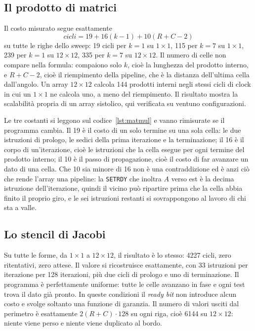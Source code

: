 \subsection{Il prodotto di matrici}
\label{sec:matmul-scala}

Il costo misurato segue esattamente
\[
    \mathit{cicli} = 19 + 16(k-1) + 10(R + C - 2)
\]
su tutte le righe dello sweep: 19 cicli per $k=1$ su $1\times1$, 115 per $k=7$
su $1\times1$, 239 per $k=1$ su $12\times12$, 335 per $k=7$ su $12\times12$.
Il numero di celle non compare nella formula: compaiono solo $k$, cioè
la lunghezza del prodotto interno, e $R+C-2$, cioè il riempimento della
pipeline, che è la distanza dell'ultima cella dall'angolo. Un array \(12 \times 12\)
calcola 144 prodotti interni negli stessi cicli di clock in cui un \(1 \times 1\) ne calcola
uno, a meno del riempimento. Il risultato mostra la scalabilità propria di un array
sistolico, qui verificata su ventuno configurazioni.


Le tre costanti si leggono sul codice~\ref{lst:matmul} e vanno rimisurate se il
programma cambia. Il 19 è il costo di un solo termine su una sola cella: le
due istruzioni di prologo, le sedici della prima iterazione e la terminazione;
il 16 è il corpo di
un'iterazione, cioè le istruzioni che la cella esegue per ogni termine del
prodotto interno; il 10 è il passo di propagazione, cioè il costo di far
avanzare un dato di una cella. Che 10 sia minore di 16 non è una
contraddizione ed è anzi ciò che rende l'array una pipeline: la \texttt{SETRDY}
che inoltra $A$ verso est è la decima istruzione dell'iterazione, quindi il
vicino può ripartire prima che la cella abbia finito il proprio giro, e le sei
istruzioni restanti si sovrappongono al lavoro di chi sta a valle.

\subsection{Lo stencil di Jacobi}

Su tutte le forme, da $1\times1$ a $12\times12$, il risultato è lo stesso: 
4227 cicli, zero ritentativi, zero attese. Il valore si ricostruisce
esattamente, con 33 istruzioni per iterazione per 128 iterazioni, più due
cicli di prologo e uno di terminazione. Il
programma è perfettamente uniforme: tutte le celle avanzano in fase e ogni
test trova il dato già pronto. In queste condizioni il \emph{ready bit} non
introduce alcun costo e svolge soltanto una funzione di garanzia. Il numero di 
valori usciti dal perimetro è esattamente $2(R+C)\cdot128$ su ogni riga, cioè 6144
su $12\times12$: niente viene perso e niente viene duplicato al bordo.

